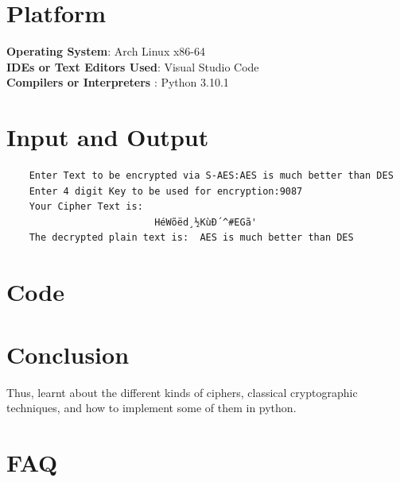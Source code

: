 \documentclass[11pt]{article}
\begin{document}
\section{Platform}
\textbf{Operating System}: Arch Linux x86-64 \\
\textbf{IDEs or Text Editors Used}: Visual Studio Code\\
\textbf{Compilers or Interpreters} : Python 3.10.1\\

\section{Input and Output}
\begin{verbatim}
    Enter Text to be encrypted via S-AES:AES is much better than DES
    Enter 4 digit Key to be used for encryption:9087
    Your Cipher Text is:  
                          HéWõëd¸½KùÐ´^#EGã'
    The decrypted plain text is:  AES is much better than DES
\end{verbatim}
\section{Code}


\section{Conclusion}
Thus, learnt about the different kinds of ciphers, classical cryptographic techniques, and how to implement some of them in python.
\clearpage

\section{FAQ}
\end{document}
